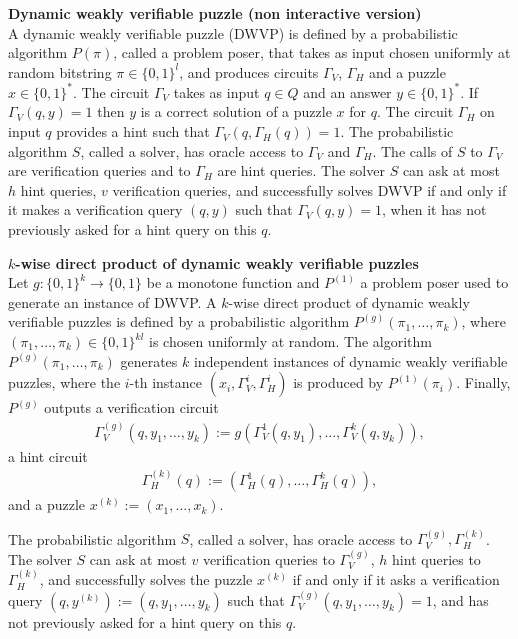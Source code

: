 \begin{definition} {\textbf{Dynamic weakly verifiable puzzle (non interactive version)}}\\
  A dynamic weakly verifiable puzzle (DWVP) is defined by a probabilistic algorithm $P(\pi)$,
  called a problem poser, that takes as input chosen uniformly at random bitstring $\pi \in \{0,1\}^l$,
  and produces circuits $\Gamma_{V}$, $\Gamma_{H}$ and a puzzle $x \in \{0,1\}^{*}$.
  The circuit $\Gamma_{V}$ takes as input $q \in Q$ and an answer $y \in \{0,1\}^*$.
  If $\Gamma_V(q,y) = 1$ then $y$ is a correct solution of a puzzle $x$ for $q$.
  The circuit $\Gamma_H$ on input $q$ provides a hint such that $\Gamma_V(q,\Gamma_H(q)) = 1$.
  The probabilistic algorithm $S$, called a solver, has oracle access to $\Gamma_V$ and $\Gamma_H$.
  The calls of $S$ to $\Gamma_V$ are verification queries and to $\Gamma_H$ are hint queries.
  The solver $S$ can ask at most $h$ hint queries, $v$ verification queries, and successfully solves DWVP if and only if
  it makes a verification query $(q,y)$ such that $\Gamma_V(q,y) = 1$, when it has not previously asked for a hint query on this $q$.
\end{definition}
%
%
\begin{definition}{\textbf{$k$-wise direct product of dynamic weakly verifiable puzzles}}\\
Let $g: \{0,1\}^{k} \rightarrow \{0,1\}$ be a monotone function and $P^{(1)}$ a problem poser used to generate an instance of DWVP.
A $k$-wise direct product of dynamic weakly verifiable puzzles is defined by a probabilistic algorithm $P^{(g)}\left(\pi_1, \dots, \pi_k \right)$,
where $(\pi_1, \dots, \pi_k) \in \{0,1\}^{kl}$ is chosen uniformly at random.
The algorithm $P^{(g)}\left(\pi_1, \dots, \pi_k \right)$ generates $k$ independent instances of dynamic weakly verifiable puzzles,
where the $i$-th instance $(x_i, \Gamma_V^{i}, \Gamma_H^{i} )$ is produced by $P^{(1)}(\pi_i)$.
Finally, $P^{(g)}$ outputs a verification circuit
\begin{align*}
  \Gamma_V^{(g)} (q, y_1, \dots, y_k) := g(\Gamma_V^{1}(q, y_1), \dots, \Gamma_V^{k}(q, y_k)),
\end{align*}
a hint circuit
\begin{align*}
  \Gamma_H^{(k)} (q) := (\Gamma_H^{1}(q), \dots, \Gamma_H^{k}(q)),
\end{align*}
and a puzzle $x^{(k)} := (x_1, \dots, x_k)$.

The probabilistic algorithm $S$, called a solver, has oracle access to $\Gamma_V^{(g)}, \Gamma_H^{(k)}$.
The solver $S$ can ask at most $v$ verification queries to $\Gamma_V^{(g)}$, $h$ hint queries to $\Gamma_H^{(k)}$, and successfully solves the puzzle $x^{(k)}$
if and only if it asks a verification query $(q, y^{(k)}) := (q, y_1, \dots, y_k)$ such that $\Gamma_V^{(g)}(q, y_1, \dots, y_k) = 1$, and has not previously asked for a hint query on this $q$.
\end{definition}
